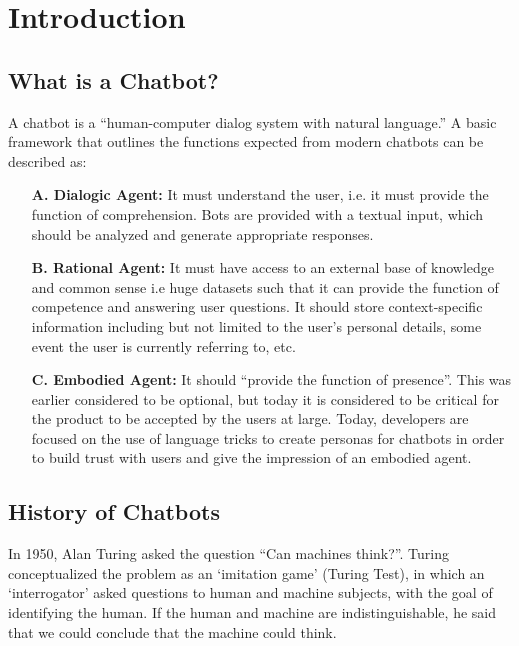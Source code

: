 %

\chapter{Introduction}
\section{What is a Chatbot?}
A chatbot is a “human-computer dialog system with natural language.”  A basic
framework that outlines the functions expected from modern chatbots can be
described as:

\begin{itemize}[align = left]
	\item[\textbf{A. Dialogic Agent:}] It must understand the user, i.e. it
		must provide the function of comprehension. Bots are provided
		with a textual input, which should be analyzed and generate
		appropriate responses.

	\item[\textbf{B. Rational Agent:}] It must have access to an external
		base of knowledge and common sense i.e huge datasets such that
		it can provide the function of competence and answering user
		questions. It should store context-specific information
		including but not limited to the user’s personal details, some
		event the user is currently referring to, etc.

	\item[\textbf{C. Embodied Agent:}] It should “provide the function of
		presence”. This was earlier considered to be optional, but today
		it is considered to be critical for the product to be accepted
		by the users at large. Today, developers are focused on the use
		of language tricks to create personas for chatbots in order to
		build trust with users and give the impression of an embodied
		agent.

\end{itemize}

\section{History of Chatbots}
In 1950, Alan Turing asked the question “Can machines think?”. Turing
conceptualized the problem as an ‘imitation game’ (Turing Test), in which an
‘interrogator’ asked questions to human and machine subjects, with the goal of
identifying the human. If the human and machine are indistinguishable, he said
that we could conclude that the machine could think. 

